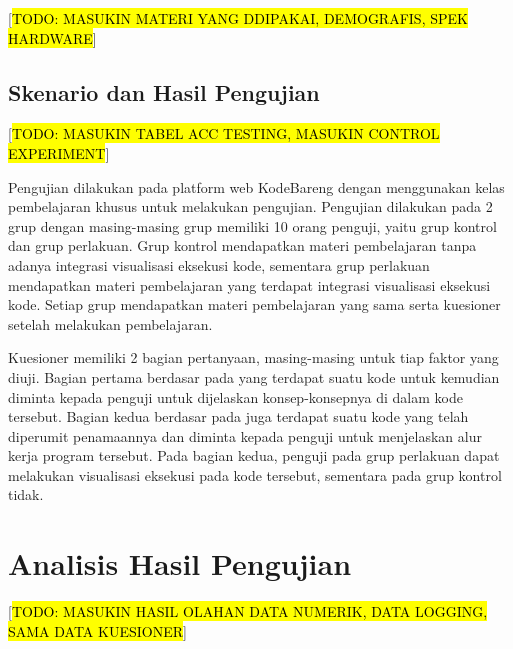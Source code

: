   [\hl{TODO: MASUKIN MATERI YANG DDIPAKAI, DEMOGRAFIS, SPEK HARDWARE}]

\subsection{Skenario dan Hasil Pengujian}
[\hl{TODO: MASUKIN TABEL ACC TESTING, MASUKIN CONTROL EXPERIMENT}]

Pengujian dilakukan pada platform web KodeBareng dengan menggunakan kelas pembelajaran khusus untuk melakukan pengujian. Pengujian dilakukan pada 2 grup dengan masing-masing grup memiliki 10 orang penguji, yaitu grup kontrol dan grup perlakuan. Grup kontrol mendapatkan materi pembelajaran tanpa adanya integrasi visualisasi eksekusi kode, sementara grup perlakuan mendapatkan materi pembelajaran yang terdapat integrasi visualisasi eksekusi kode. Setiap grup mendapatkan materi pembelajaran yang sama serta kuesioner setelah melakukan pembelajaran.

Kuesioner memiliki 2 bagian pertanyaan, masing-masing untuk tiap faktor yang diuji. Bagian pertama berdasar pada \textcite{mayer1981psychology} yang terdapat suatu kode untuk kemudian diminta kepada penguji untuk dijelaskan konsep-konsepnya di dalam kode tersebut. Bagian kedua berdasar pada \textcite{moons2013pilot} juga terdapat suatu kode yang telah diperumit penamaannya dan diminta kepada penguji untuk menjelaskan alur kerja program tersebut. Pada bagian kedua, penguji pada grup perlakuan dapat melakukan visualisasi eksekusi pada kode tersebut, sementara pada grup kontrol tidak.


\section{Analisis Hasil Pengujian}
 [\hl{TODO: MASUKIN HASIL OLAHAN DATA NUMERIK, DATA LOGGING, SAMA DATA KUESIONER}]

\blindtext
